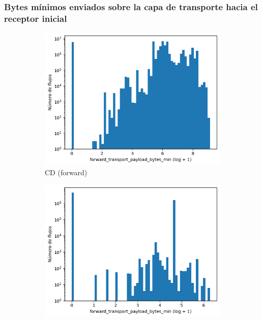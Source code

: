 \subsubsection{Bytes mínimos enviados sobre la capa de transporte hacia el receptor inicial}

\begin{figure}[H]
    \centering
    \begin{subfigure}[b]{0.32\textwidth}
        \centering
        \includegraphics[width=\textwidth]{media/packet_pincer_cicddos/forward_transport_payload_bytes_min_log_x_log_y.png}
        \caption{CD (forward)}
    \end{subfigure}
    \hfill
    \begin{subfigure}[b]{0.32\textwidth}
        \centering
        \includegraphics[width=\linewidth]{media/packet_pincer_botiot/forward_transport_payload_bytes_min_log_x_log_y.png}

\end{subfigure}
\end{figure}
